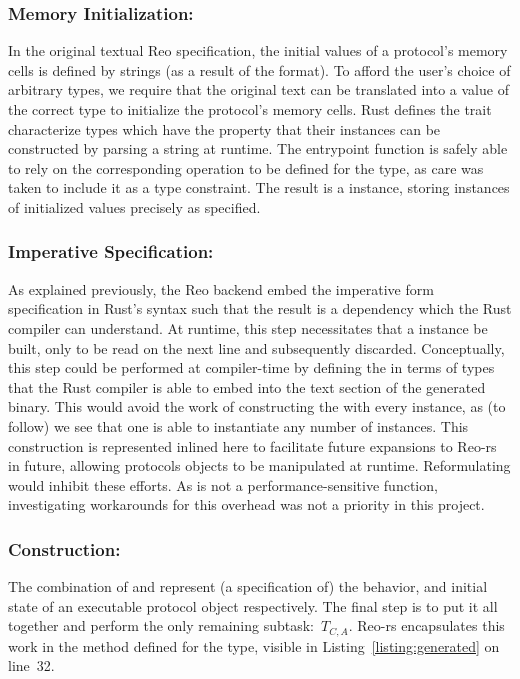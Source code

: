 \subsubsection{Memory Initialization: }



In the original textual Reo specification, the initial values of a protocol's memory cells is defined by strings (as a result of the format). To afford the user's choice of arbitrary types, we require that the original text can be translated into a value of the correct type to initialize the protocol's memory cells. Rust defines the  trait characterize types which have the property that their instances can be constructed by parsing a string at runtime. The entrypoint function is safely able to rely on the corresponding  operation to be defined for the type, as care was taken to include it as a type constraint. The result is a  instance, storing instances of initialized values precisely as specified.

\subsubsection{Imperative Specification: }
As explained previously, the Reo backend embed the imperative form specification in Rust's syntax such that the result is a dependency which the Rust compiler can understand. At runtime, this step necessitates that a  instance be built, only to be read on the next line and subsequently discarded. Conceptually, this step could be performed at compiler-time by defining the  in terms of types that the Rust compiler is able to embed into the text section of the generated binary. This would avoid the work of constructing the  with every instance, as (to follow) we see that one  is able to instantiate any number of  instances. This construction is represented inlined here to facilitate future expansions to Reo-rs in future, allowing protocols objects to be manipulated at runtime. Reformulating  would inhibit these efforts. As  is not a performance-sensitive function, investigating workarounds for this overhead was not a priority in this project.

\subsubsection{Construction: }
The combination of  and  represent (a specification of) the behavior, and initial state of an executable protocol object respectively. The final step is to put it all together and perform the only remaining subtask:~$T_{C,A}$. Reo-rs encapsulates this work in the  method defined for the  type, visible in Listing~\ref{listing:generated} on line~32. 

